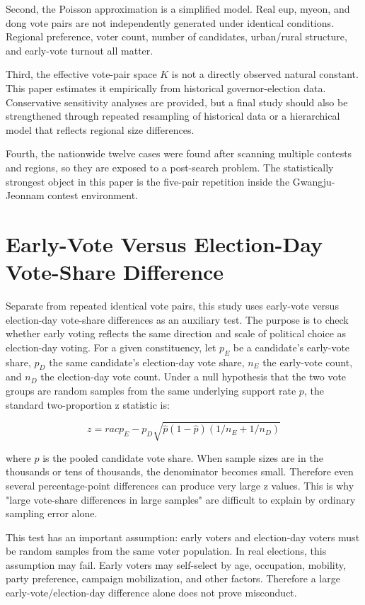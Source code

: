 \documentclass[preprint]{../ieie/IEIE}
\begin{document}
Second, the Poisson approximation is a simplified model. Real eup, myeon, and dong vote pairs are not independently generated under identical conditions. Regional preference, voter count, number of candidates, urban/rural structure, and early-vote turnout all matter.

Third, the effective vote-pair space \(K\) is not a directly observed natural constant. This paper estimates it empirically from historical governor-election data. Conservative sensitivity analyses are provided, but a final study should also be strengthened through repeated resampling of historical data or a hierarchical model that reflects regional size differences.

Fourth, the nationwide twelve cases were found after scanning multiple contests and regions, so they are exposed to a post-search problem. The statistically strongest object in this paper is the five-pair repetition inside the Gwangju-Jeonnam contest environment.

\section{Early-Vote Versus Election-Day Vote-Share Difference}

Separate from repeated identical vote pairs, this study uses early-vote versus election-day vote-share differences as an auxiliary test. The purpose is to check whether early voting reflects the same direction and scale of political choice as election-day voting. For a given constituency, let \(p_E\) be a candidate's early-vote share, \(p_D\) the same candidate's election-day vote share, \(n_E\) the early-vote count, and \(n_D\) the election-day vote count. Under a null hypothesis that the two vote groups are random samples from the same underlying support rate \(p\), the standard two-proportion z statistic is:

\[
z =
rac{p_E - p_D}{\sqrt{\hat{p}(1-\hat{p})(1/n_E + 1/n_D)}}
\]

where \(\hat{p}\) is the pooled candidate vote share. When sample sizes are in the thousands or tens of thousands, the denominator becomes small. Therefore even several percentage-point differences can produce very large z values. This is why "large vote-share differences in large samples" are difficult to explain by ordinary sampling error alone.

This test has an important assumption: early voters and election-day voters must be random samples from the same voter population. In real elections, this assumption may fail. Early voters may self-select by age, occupation, mobility, party preference, campaign mobilization, and other factors. Therefore a large early-vote/election-day difference alone does not prove misconduct.
\end{document}

